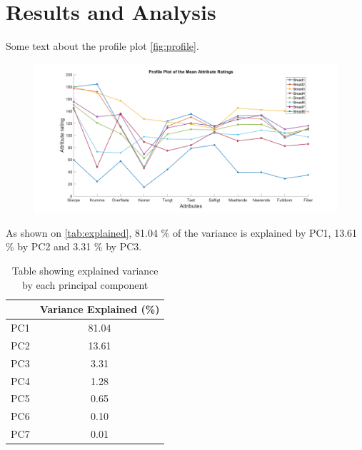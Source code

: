 \section*{Results and Analysis}
\label{Results}
%

Some text about the profile plot \autoref{fig:profile}.
\begin{figure}[H]
\centering
\includegraphics[width =\textwidth]{Figure/profile_plot}
\caption{}
\label{fig:profile}
\end{figure}
\noindent


As shown on \autoref{tab:explained}, 81.04 \% of the variance is explained by PC1, 13.61 \% by PC2 and 3.31 \% by PC3. 
\begin{table}[H]
\centering
\begin{tabular}{lc}
\hline
                         & \multicolumn{1}{l}{Variance Explained (\%)} \\ \hline
\multicolumn{1}{l|}{PC1} & 81.04                                       \\
\multicolumn{1}{l|}{PC2} & 13.61                                       \\
\multicolumn{1}{l|}{PC3} & 3.31                                        \\
\multicolumn{1}{l|}{PC4} & 1.28                                        \\
\multicolumn{1}{l|}{PC5} & 0.65                                        \\
\multicolumn{1}{l|}{PC6} & 0.10                                        \\
\multicolumn{1}{l|}{PC7} & 0.01                                       
\end{tabular}
\caption{Table showing explained variance by each principal component}
\label{tab:explained}
\end{table}


